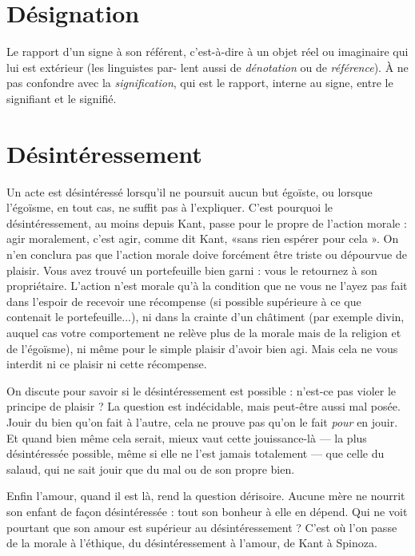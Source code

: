 \section{Désignation}
Le rapport d’un signe à son référent, c’est-à-dire à un objet
réel ou imaginaire qui lui est extérieur (les linguistes par-
lent aussi de {\it dénotation} ou de {\it référence}). À ne pas confondre avec la {\it signification},
qui est le rapport, interne au signe, entre le signifiant et le signifié.

\section{Désintéressement}
Un acte est désintéressé lorsqu'il ne poursuit aucun
but égoïste, ou lorsque l’égoïsme, en tout cas, ne
suffit pas à l’expliquer. C’est pourquoi le désintéressement, au moins depuis
Kant, passe pour le propre de l’action morale : agir moralement, c’est agir,
comme dit Kant, «sans rien espérer pour cela ». On n’en conclura pas que
l’action morale doive forcément être triste ou dépourvue de plaisir. Vous avez
trouvé un portefeuille bien garni : vous le retournez à son propriétaire. L'action
n'est morale qu’à la condition que ne vous ne l’ayez pas fait dans l'espoir de
recevoir une récompense (si possible supérieure à ce que contenait le portefeuille...),
ni dans la crainte d’un châtiment (par exemple divin, auquel cas
votre comportement ne relève plus de la morale mais de la religion et de
l’égoïsme), ni même pour le simple plaisir d’avoir bien agi. Mais cela ne vous
interdit ni ce plaisir ni cette récompense.

On discute pour savoir si le désintéressement est possible : n’est-ce pas
violer le principe de plaisir ? La question est indécidable, mais peut-être aussi
mal posée. Jouir du bien qu’on fait à l’autre, cela ne prouve pas qu’on le fait
{\it pour} en jouir. Et quand bien même cela serait, mieux vaut cette jouissance-là
— la plus désintéressée possible, même si elle ne l’est jamais totalement — que
celle du salaud, qui ne sait jouir que du mal ou de son propre bien.

Enfin l'amour, quand il est là, rend la question dérisoire. Aucune mère ne
nourrit son enfant de façon désintéressée : tout son bonheur à elle en dépend.
Qui ne voit pourtant que son amour est supérieur au désintéressement ? C’est
où l’on passe de la morale à l'éthique, du désintéressement à l’amour, de Kant
à Spinoza.

